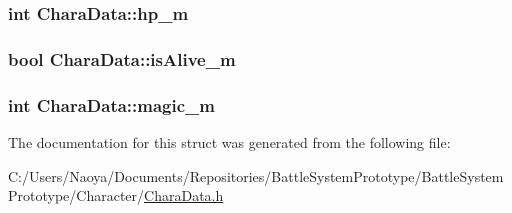 \subsubsection[{hp\+\_\+m}]{\setlength{\rightskip}{0pt plus 5cm}int Chara\+Data\+::hp\+\_\+m}\label{struct_chara_data_a7186ee61c28b6a84b0c7a41524ee7d01}
\hypertarget{struct_chara_data_a87b4617204eaa6cb9a683389afb0647e}{}
\subsubsection[{is\+Alive\+\_\+m}]{\setlength{\rightskip}{0pt plus 5cm}bool Chara\+Data\+::is\+Alive\+\_\+m}\label{struct_chara_data_a87b4617204eaa6cb9a683389afb0647e}
\hypertarget{struct_chara_data_ad76e5c9e2a90755979af927101ec43ac}{}
\subsubsection[{magic\+\_\+m}]{\setlength{\rightskip}{0pt plus 5cm}int Chara\+Data\+::magic\+\_\+m}\label{struct_chara_data_ad76e5c9e2a90755979af927101ec43ac}


The documentation for this struct was generated from the following file\+:\begin{DoxyCompactItemize}
\item 
C\+:/\+Users/\+Naoya/\+Documents/\+Repositories/\+Battle\+System\+Prototype/\+Battle\+System\+Prototype/\+Character/\hyperlink{_chara_data_8h}{Chara\+Data.\+h}\end{DoxyCompactItemize}
